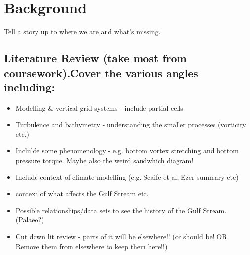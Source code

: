 \documentclass[..\EOYR.tex]{subfiles}
\begin{document}
\section{Background}
Tell a story up to where we are and what's missing.
\subsection{Literature Review (take most from coursework).Cover the various angles including:}
\begin{itemize}
  \item Modelling \& vertical grid systems - include partial cells
  \item Turbulence and bathymetry - understanding the smaller processes (vorticity etc.) \citep{Tansley2001} \citep{Nikurashin2012a}
  \item Inclulde some phenomenology - e.g. bottom vortex stretching and bottom pressure torque. Maybe also the weird sandwhich diagram!
  \item Include context of climate modelling (e.g. Scaife et al, Ezer summary etc)
  \item context of what affects the Gulf Stream etc.
  \item Possible relationships/data sets to see the history of the Gulf Stream. (Palaeo?) \citep{Ezer2015}
  \item Cut down lit review - parts of it will be elsewhere!! (or should be! OR Remove them from elsewhere to keep them here!!)
\end{itemize}
\end{document}
